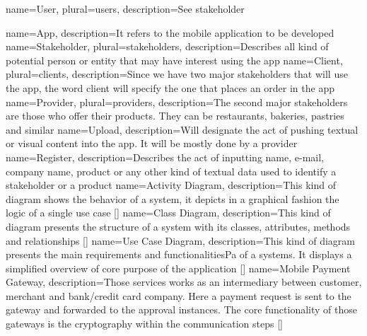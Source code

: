
 {
    name={User},
    plural={users},
    description={See stakeholder}
}

 {
    name={App},
    description={It refers to the mobile application to be developed}
}
 {
    name={Stakeholder},
    plural={stakeholders},
    description={Describes all kind of potential person or entity that may have interest using the app}
}
 {
    name={Client},
    plural={clients},
    description={Since we have two major stakeholders that will use the app, the word client will
    specify the one that places an order in the app}
}
 {
    name={Provider},
    plural={providers},
    description={The second major stakeholders are those who offer their products. They can be
                restaurants, bakeries, pastries and similar}
}
 {
    name={Upload},
    description={Will designate the act of pushing textual or visual content into the app. It will
                be mostly done by a provider}
}
 {
    name={Register},
    description={Describes the act of inputting name, e-mail, company name, product or any other kind of
    textual data used to identify a stakeholder or a product}
}
 {
    name={Activity Diagram},
    description={This kind of diagram shows the behavior of a system, it depicts in a graphical fashion 
    the logic of a single use case [\cite{refinbook:Baresi2009}]}
}
 {
    name={Class Diagram},
    description={This kind of diagram presents the structure of a system with its classes, attributes,
    methods and relationships [\cite{refonline:IBMCD}]}
}
 {
    name={Use Case Diagram},
    description={This kind of diagram presents the main requirements and functionalitiesPa of a systems. It displays
    a simplified overview of core purpose of the application [\cite{refart:YWRUS}]}
}
 {
    name={Mobile Payment Gateway},
    description={Those services works as an intermediary between customer, merchant and bank/credit card company. 
    Here a payment request is sent to the gateway and forwarded to the approval instances. The core functionality 
    of those gateways is the cryptography within the communication steps [\cite{refonline:VPGI}]}
}

